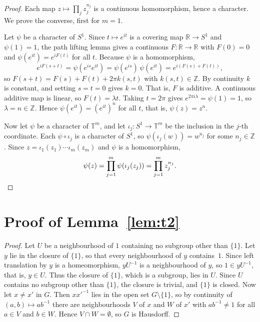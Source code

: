 \documentclass[11pt]{article}
\newcommand{\T}{\mathbb{T}}
\newcommand{\Z}{\mathbb{Z}}
\newcommand{\R}{\mathbb{R}}
\begin{document}
\begin{proof}
Each map $z \mapsto \prod_j z_j^{n_j}$ is a continuous homomorphism, hence a character. We prove the converse, first for $m = 1$.

Let $\psi$ be a character of $S^1$. Since $t \mapsto e^{it}$ is a covering map $\R \to S^1$ and $\psi(1) = 1$, the path lifting lemma gives a continuous $F\colon \R \to \R$ with $F(0) = 0$ and $\psi(e^{it}) = e^{iF(t)}$ for all $t$. Because $\psi$ is a homomorphism,
\[
  e^{iF(s+t)} = \psi(e^{is}e^{it}) = \psi(e^{is})\,\psi(e^{it}) = e^{i(F(s)+F(t))},
\]
so $F(s+t) = F(s) + F(t) + 2\pi k(s,t)$ with $k(s,t) \in \Z$. By continuity $k$ is constant, and setting $s = t = 0$ gives $k = 0$. That is, $F$ is additive. A continuous additive map is linear, so $F(t) = \lambda t$. Taking $t = 2\pi$ gives $e^{2\pi i\lambda} = \psi(1) = 1$, so $\lambda = n \in \Z$. Hence $\psi(e^{it}) = (e^{it})^n$ for all $t$, that is, $\psi(z) = z^n$.

Now let $\psi$ be a character of $\T^m$, and let $\iota_j\colon S^1 \to \T^m$ be the inclusion in the $j$-th coordinate. Each $\psi \circ \iota_j$ is a character of $S^1$, so $\psi(\iota_j(w)) = w^{n_j}$ for some $n_j \in \Z$. Since $z = \iota_1(z_1) \cdots \iota_m(z_m)$ and $\psi$ is a homomorphism,
\[
  \psi(z) = \prod_{j=1}^m \psi(\iota_j(z_j)) = \prod_{j=1}^m z_j^{n_j}. \qedhere
\]
\end{proof}

\section{Proof of Lemma~\ref{lem:t2}}\label{app:t2}

\begin{proof}
Let $U$ be a neighbourhood of $1$ containing no subgroup other than $\{1\}$. Let $y$ lie in the closure of $\{1\}$, so that every neighbourhood of $y$ contains~$1$. Since left translation by $y$ is a homeomorphism, $yU^{-1}$ is a neighbourhood of $y$, so $1 \in yU^{-1}$, that is, $y \in U$. Thus the closure of $\{1\}$, which is a subgroup, lies in $U$. Since $U$ contains no subgroup other than $\{1\}$, the closure is trivial, and $\{1\}$ is closed. Now let $x \neq x'$ in $G$. Then $xx'^{-1}$ lies in the open set $G \setminus \{1\}$, so by continuity of $(a,b) \mapsto ab^{-1}$ there are neighbourhoods $V$ of $x$ and $W$ of $x'$ with $ab^{-1} \neq 1$ for all $a \in V$ and $b \in W$. Hence $V \cap W = \emptyset$, so $G$ is Hausdorff.
\end{proof}
\end{document}
